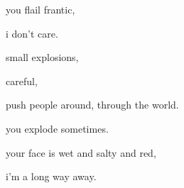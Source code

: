 \documentclass[extrafontsizes, 48pt]{memoir}
\newcommand\blankpage{%
    \null
    \thispagestyle{empty}%
    \addtocounter{page}{-1}%
    \newpage}
\begin{document}
	\begin{minipage}{.6\textwidth}
	you flail frantic,
	\end{minipage}
	\newpage

	\begin{minipage}{.6\textwidth}
	i don't care.
	\afterpage{\blankpage}
	\end{minipage}
	\newpage

	\begin{minipage}{.6\textwidth}
	small explosions,
	\end{minipage}
	\newpage

	\begin{minipage}{.6\textwidth}
	careful,
	\end{minipage}
	\newpage

	\begin{minipage}{.6\textwidth}
	push people around, through the world.
	\end{minipage}
	\newpage

	\begin{minipage}{.6\textwidth}
	you explode sometimes.
	\afterpage{\blankpage}
	\end{minipage}
	\newpage

	\begin{minipage}{.6\textwidth}
	your face is wet and salty and red,
	\end{minipage}
	\newpage

	\begin{minipage}{.6\textwidth}
	i'm a long way away.
	\end{minipage}
	\newpage
\end{document}

